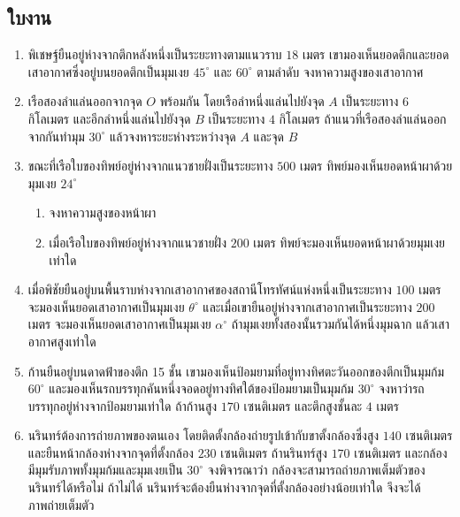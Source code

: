 \newpage
\subsection*{ใบงาน}
\begin{enumerate}[label=\arabic*., leftmargin=*, itemsep=1em]
	\item พิเชษฐ์ยืนอยู่ห่างจากตึกหลังหนึ่งเป็นระยะทางตามแนวราบ $18$ เมตร เขามองเห็นยอดตึกและยอดเสาอากาศซึ่งอยู่บนยอดตึกเป็นมุมเงย $45^{\circ}$ และ $60^{\circ}$ ตามลำดับ จงหาความสูงของเสาอากาศ
	
	\item เรือสองลำแล่นออกจากจุด $O$ พร้อมกัน โดยเรือลำหนึ่งแล่นไปยังจุด $A$ เป็นระยะทาง $6$ กิโลเมตร และอีกลำหนึ่งแล่นไปยังจุด $B$ เป็นระยะทาง $4$ กิโลเมตร ถ้าแนวที่เรือสองลำแล่นออกจากกันทำมุม $30^{\circ}$ แล้วจงหาระยะห่างระหว่างจุด $A$ และจุด $B$
	
	\item ขณะที่เรือใบของทิพย์อยู่ห่างจากแนวชายฝั่งเป็นระยะทาง $500$ เมตร ทิพย์มองเห็นยอดหน้าผาด้วยมุมเงย $24^{\circ}$
	\begin{enumerate}[label=\theenumi\arabic*), leftmargin=1.5em, itemsep=0.6em]
		\everymath{\displaystyle}
		\item จงหาความสูงของหน้าผา
		\item เมื่อเรือใบของทิพย์อยู่ห่างจากแนวชายฝั่ง $200$ เมตร ทิพย์จะมองเห็นยอดหน้าผาด้วยมุมเงยเท่าใด
	\end{enumerate}
	
	\item เมื่อพิชัยยืนอยู่บนพื้นราบห่างจากเสาอากาศของสถานีโทรทัศน์แห่งหนึ่งเป็นระยะทาง $100$ เมตร จะมองเห็นยอดเสาอากาศเป็นมุมเงย $\theta^{\circ}$ และเมื่อเขายืนอยู่ห่างจากเสาอากาศเป็นระยะทาง $200$ เมตร จะมองเห็นยอดเสาอากาศเป็นมุมเงย $\alpha^{\circ}$ ถ้ามุมเงยทั้งสองนั้นรวมกันได้หนึ่งมุมฉาก แล้วเสาอากาศสูงเท่าใด
	
	\item ก้านยืนอยู่บนดาดฟ้าของตึก 15 ชั้น เขามองเห็นป้อมยามที่อยู่ทางทิศตะวันออกของตึกเป็นมุมก้ม $60^{\circ}$ และมองเห็นรถบรรทุกคันหนึ่งจอดอยู่ทางทิศใต้ของป้อมยามเป็นมุมก้ม $30^{\circ}$ จงหาว่ารถบรรทุกอยู่ห่างจากป้อมยามเท่าใด ถ้าก้านสูง $170$ เซนติเมตร และตึกสูงชั้นละ $4$ เมตร
	
	\item นรินทร์ต้องการถ่ายภาพของตนเอง โดยติดตั้งกล้องถ่ายรูปเข้ากับขาตั้งกล้องซึ่งสูง $140$ เซนติเมตร และยืนหน้ากล้องห่างจากจุดที่ตั้งกล้อง $230$ เซนติเมตร ถ้านรินทร์สูง $170$ เซนติเมตร และกล้องมีมุมรับภาพทั้งมุมก้มและมุมเงยเป็น $30^{\circ}$ จงพิจารณาว่า กล้องจะสามารถถ่ายภาพเต็มตัวของนรินทร์ได้หรือไม่ ถ้าไม่ได้ นรินทร์จะต้องยืนห่างจากจุดที่ตั้งกล้องอย่างน้อยเท่าใด จึงจะได้ภาพถ่ายเต็มตัว
	

\end{enumerate}
